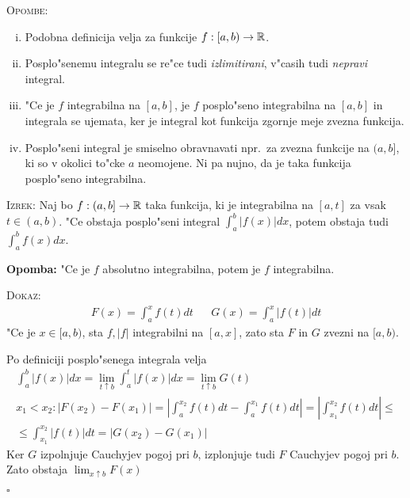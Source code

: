 \textsc{Opombe:}
\begin{enumerate}[(i)]
	\item Podobna definicija velja za funkcije $f: [a, b) \to \mathbb{R}$.
	\item Posplo"senemu integralu se re"ce tudi \emph{izlimitirani}, v"casih tudi \emph{nepravi} integral.
	\item "Ce je $f$ integrabilna na $[a, b]$, je $f$ posplo"seno integrabilna na $[a, b]$ in integrala se ujemata, ker je integral kot funkcija zgornje meje zvezna funkcija.
	\item Posplo"seni integral je smiselno obravnavati npr.\, za zvezna funkcije na $(a, b]$, ki so v okolici to"cke $a$ neomojene. Ni pa nujno, da je taka funkcija posplo"seno integrabilna.
\end{enumerate}
%
\textsc{Izrek:} Naj bo $f: (a, b] \to \mathbb{R}$ taka funkcija, ki je integrabilna na $[a, t]$ za vsak $t \in (a, b)$. "Ce obstaja posplo"seni integral $\int_a^b |f(x)| dx$, potem obstaja tudi $\int_a^b f(x) dx$.

\textbf{Opomba:} "Ce je $f$ absolutno integrabilna, potem je $f$ integrabilna.

\textsc{Dokaz:}
\begin{align*}
F(x) = \int_a^x f(t)dt && G(x) = \int_a^x |f(t)| dt
\end{align*}
"Ce je $x \in [a, b)$, sta $f, |f|$ integrabilni na $[a, x]$, zato sta $F$ in $G$ zvezni na $[a, b)$. 

Po definiciji posplo"senega integrala velja
\begin{gather*}
\int_a^b |f(x)| dx = \lim_{t \uparrow b} \int_a^t |f(x)| dx = \lim_{t \uparrow b} G(t) \\
x_1 < x_2: |F(x_2) - F(x_1)| = \left| \int_a^{x_2} f(t) dt - \int_a^{x_1} f(t)dt \right| = \left| \int_{x_1}^{x_2} f(t) dt \right| \leq \\
\leq \int_{x_1}^{x_2} |f(t)| dt = |G(x_2) - G(x_1)|
\end{gather*}
Ker $G$ izpolnjuje Cauchyjev pogoj pri $b$, izplonjuje tudi $F$ Cauchyjev pogoj pri $b$. Zato obstaja $\lim_{x \uparrow b} F(x)$

\hfill $\square$

